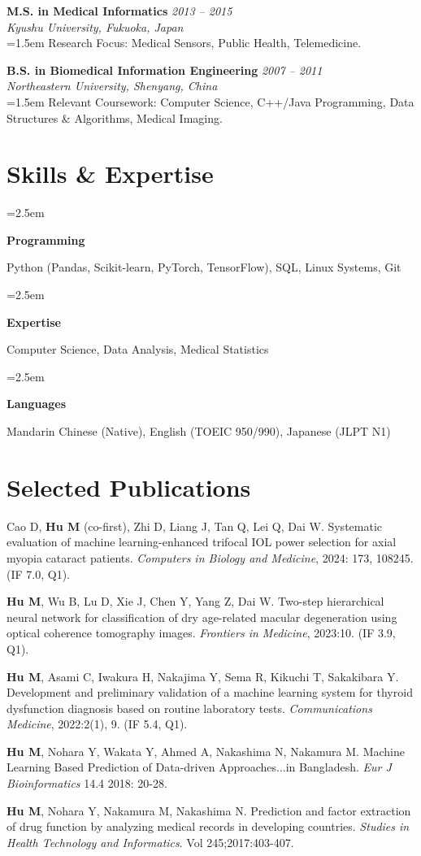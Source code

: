 \documentclass[11pt, a4paper]{scrartcl}
\newcommand{\educationentry}[4]{%
    \noindent\textbf{#2} \hfill \textit{\color{gray} #1} \\
    \textit{#3} \\
    \vspace{0.5ex}
    \noindent\hangindent=1.5em\hangafter=0 \small #4 \normalsize\par
    \vspace{1.5ex}
}
\newcommand{\entry}[2]{%
    \noindent\hangindent=2.5em\hangafter=0
    \parbox{8em}{\textbf{#1}}{#2}\par
    \vspace{0.7ex}
}
\begin{document}
\educationentry{2013 -- 2015}
    {M.S. in Medical Informatics}
    {Kyushu University, Fukuoka, Japan}
    {Research Focus: Medical Sensors, Public Health, Telemedicine.}

\educationentry{2007 -- 2011}
    {B.S. in Biomedical Information Engineering}
    {Northeastern University, Shenyang, China}
    {Relevant Coursework: Computer Science, C++/Java Programming, Data Structures \& Algorithms, Medical Imaging.}

\section*{Skills \& Expertise}
\entry{Programming}{Python (Pandas, Scikit-learn, PyTorch, TensorFlow), SQL, Linux Systems, Git}
\entry{Expertise}{Computer Science, Data Analysis, Medical Statistics}
\entry{Languages}{Mandarin Chinese (Native), English (TOEIC 950/990), Japanese (JLPT N1)}

\section*{Selected Publications}
{\small
\begin{enumerate}[label={[\arabic*]}, leftmargin=*, itemsep=1ex]
    \item Cao D, \textbf{Hu M} (co-first), Zhi D, Liang J, Tan Q, Lei Q, Dai W. Systematic evaluation of machine learning-enhanced trifocal IOL power selection for axial myopia cataract patients. \textit{Computers in Biology and Medicine}, 2024: 173, 108245. (IF 7.0, Q1).
    \item \textbf{Hu M}, Wu B, Lu D, Xie J, Chen Y, Yang Z, Dai W. Two-step hierarchical neural network for classification of dry age-related macular degeneration using optical coherence tomography images. \textit{Frontiers in Medicine}, 2023:10. (IF 3.9, Q1).
    \item \textbf{Hu M}, Asami C, Iwakura H, Nakajima Y, Sema R, Kikuchi T, Sakakibara Y. Development and preliminary validation of a machine learning system for thyroid dysfunction diagnosis based on routine laboratory tests. \textit{Communications Medicine}, 2022:2(1), 9. (IF 5.4, Q1).
    \item \textbf{Hu M}, Nohara Y, Wakata Y, Ahmed A, Nakashima N, Nakamura M. Machine Learning Based Prediction of Data-driven Approaches...in Bangladesh. \textit{Eur J Bioinformatics} 14.4 2018: 20-28.
    \item \textbf{Hu M}, Nohara Y, Nakamura M, Nakashima N. Prediction and factor extraction of drug function by analyzing medical records in developing countries. \textit{Studies in Health Technology and Informatics}. Vol 245;2017:403-407.
\end{enumerate}
}
\end{document}
